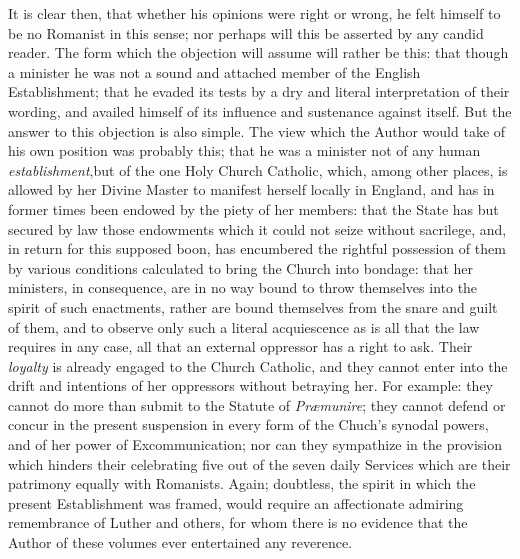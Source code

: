 It is clear then, that whether
his opinions were right or wrong, he felt himself to be no Romanist in
this sense; nor perhaps will this be asserted by any candid reader.
The form which the objection will assume will rather be this: that
though a minister he was not a sound and attached member of the
English Establishment; that he evaded its tests by a dry and literal
interpretation of their wording, and availed himself of its influence
and sustenance against itself. But the answer to this objection is
also simple. The view which the Author would take of his own position
was probably this; that he was a minister not of any human \emph{establishment},\emph{}but of the one Holy Church Catholic, which, among other places, is
allowed by her Divine Master to manifest herself locally in England,
and has in former times been endowed by the piety of her members: that
the State has but secured by law those endowments which it could not
seize without sacrilege, and, in return for this supposed boon, has
encumbered the rightful possession of them by various conditions
calculated to bring the Church into bondage: that her ministers,
in consequence, are in no way bound to throw themselves into the
spirit of such enactments, rather are bound themselves from the snare
and guilt of them, and to observe only such a literal acquiescence as
is all that the law requires in any case, all that an external
oppressor has a right to ask. Their \emph{loyalty} is already engaged
to the Church Catholic, and they cannot enter into the drift and
intentions of her oppressors without betraying her. For example: they
cannot do more than submit to the Statute of \emph{Præmunire}; they
cannot defend or concur in the present suspension in every form of the
Chuch's synodal powers, and of her power of Excommunication; nor can
they sympathize in the provision which hinders their celebrating five
out of the seven daily Services which are their patrimony equally with
Romanists. Again; doubtless, the spirit in which the present
Establishment was framed, would require an affectionate admiring
remembrance of Luther and others, for whom there is no evidence that
the Author of these volumes ever entertained any reverence.

